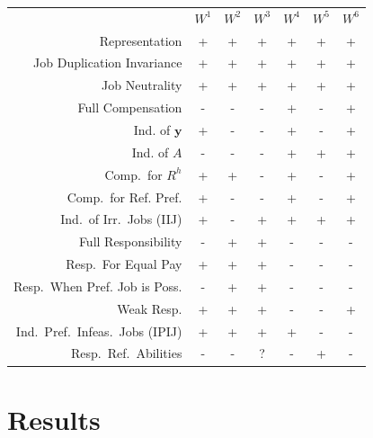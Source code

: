 \documentclass[12pt]{article}
\begin{document}
\begin{tabular}{r|c|c|c|c|c|c|}
     & $W^1$ & $W^2$ & $W^3$ & $W^4$ & $W^5$ & $W^6$ \\
Representation & + & + & + & + & + & + \\
Job Duplication Invariance & + & + & + & + & + & + \\
Job Neutrality & + & + & + & + & + & + \\
Full Compensation     & - & - & - & + & - & + \\
Ind. of $\mathbf{y}$     & + & - & - & + & - & + \\
Ind. of $A$     & - & - & - & + & + & + \\
Comp.\ for $R^{h}$     & + & + & - & + & - & + \\
Comp.\ for Ref. Pref.     & + & - & - & + & - & + \\
Ind.\ of Irr.\ Jobs (IIJ)     & + & - & + & + & + & + \\
Full Responsibility     & - & + & + & - & - & - \\
Resp.\ For Equal Pay     & + & + & + & - & - & - \\
Resp.\ When Pref. Job is Poss.     & - & + & + & - & - & - \\
Weak Resp.     & + & + & + & - & - & +\\
Ind.\ Pref.\ Infeas.\ Jobs (IPIJ)    & + & + & + & + & - & - \\
Resp.\ Ref.\ Abilities   & - & - & ? & - & + & - \\
\end{tabular}

\section{Results}
\end{document}
